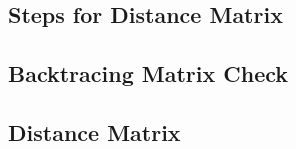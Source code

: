 \subsection{Steps for Distance Matrix}
\subsection{Backtracing Matrix Check}
\subsection{Distance Matrix}